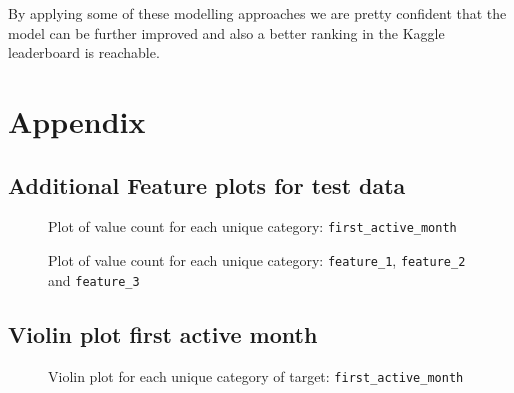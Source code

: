 \documentclass{article}
\begin{document}
By applying some of these modelling approaches we are pretty confident that the model can be further improved and also a better ranking in the Kaggle leaderboard is reachable.



\newpage



\newpage
\section{Appendix}
\label{sec:appendix}

\subsection{Additional Feature plots for test data}
\begin{figure}[h]
  \centering
  
  \caption{Plot of value count for each unique category: \texttt{first\_active\_month}}
  \label{fig:catplot_first_active_month_test}
\end{figure}

\begin{figure}[h]
     \centering
     \begin{subfigure}[b]{0.4\textwidth}
         \centering
         
     \end{subfigure}
     \hfill
     \begin{subfigure}[b]{0.25\textwidth}
         \centering
         
     \end{subfigure}
     \hfill
     \begin{subfigure}[b]{0.2\textwidth}
         \centering
         
     \end{subfigure}
        \caption{Plot of value count for each unique category: \texttt{feature\_1}, \texttt{feature\_2} and \texttt{feature\_3}}
        \label{fig:catplot_features_test}
\end{figure}

\newpage
\subsection{Violin plot first active month}

\begin{figure}[h]
  \centering
  
  \caption{Violin plot for each unique category of target: \texttt{first\_active\_month}}
  \label{fig:violin_first_active_month_test}
\end{figure}
\end{document}
